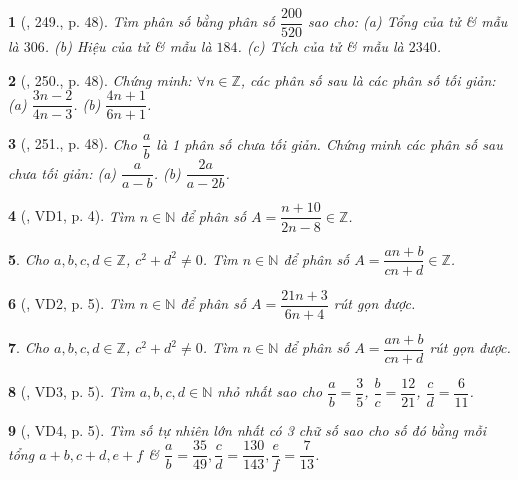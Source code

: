 \documentclass{article}
\newtheorem{baitoan}{}
\begin{document}
\begin{baitoan}[\cite{Tuyen_Toan_6}, 249., p. 48]
	Tìm phân số bằng phân số $\dfrac{200}{520}$ sao cho: (a) Tổng của tử \& mẫu là $306$. (b) Hiệu của tử \& mẫu là $184$. (c) Tích của tử \& mẫu là $2340$.
\end{baitoan}

\begin{baitoan}[\cite{Tuyen_Toan_6}, 250., p. 48]
	Chứng minh: $\forall n\in\mathbb{Z}$, các phân số sau là các phân số tối giản: (a) $\dfrac{3n - 2}{4n - 3}$. (b) $\dfrac{4n + 1}{6n + 1}$.
\end{baitoan}

\begin{baitoan}[\cite{Tuyen_Toan_6}, 251., p. 48]
	Cho $\dfrac{a}{b}$ là 1 phân số chưa tối giản. Chứng minh các phân số sau chưa tối giản: (a) $\dfrac{a}{a - b}$. (b) $\dfrac{2a}{a - 2b}$.
\end{baitoan}

\begin{baitoan}[\cite{Binh_Toan_6_tap_2}, VD1, p. 4]
	Tìm $n\in\mathbb{N}$ để phân số $A = \dfrac{n + 10}{2n - 8}\in\mathbb{Z}$.
\end{baitoan}

\begin{baitoan}
	Cho $a,b,c,d\in\mathbb{Z}$, $c^2 + d^2\ne0$. Tìm $n\in\mathbb{N}$ để phân số $A = \dfrac{an + b}{cn + d}\in\mathbb{Z}$.
\end{baitoan}

\begin{baitoan}[\cite{Binh_Toan_6_tap_2}, VD2, p. 5]
	Tìm $n\in\mathbb{N}$ để phân số $A = \dfrac{21n + 3}{6n + 4}$ rút gọn được.
\end{baitoan}

\begin{baitoan}
	Cho $a,b,c,d\in\mathbb{Z}$, $c^2 + d^2\ne0$. Tìm $n\in\mathbb{N}$ để phân số $A = \dfrac{an + b}{cn + d}$ rút gọn được.
\end{baitoan}

\begin{baitoan}[\cite{Binh_Toan_6_tap_2}, VD3, p. 5]
	Tìm $a,b,c,d\in\mathbb{N}$ nhỏ nhất sao cho $\dfrac{a}{b} = \dfrac{3}{5}$, $\dfrac{b}{c} = \dfrac{12}{21}$, $\dfrac{c}{d} = \dfrac{6}{11}$.
\end{baitoan}

\begin{baitoan}[\cite{Binh_Toan_6_tap_2}, VD4, p. 5]
	Tìm số tự nhiên lớn nhất có 3 chữ số sao cho số đó bằng mỗi tổng $a + b,c + d,e + f$ \& $\dfrac{a}{b} = \dfrac{35}{49},\dfrac{c}{d} = \dfrac{130}{143},\dfrac{e}{f} = \dfrac{7}{13}$.
\end{baitoan}
\end{document}
